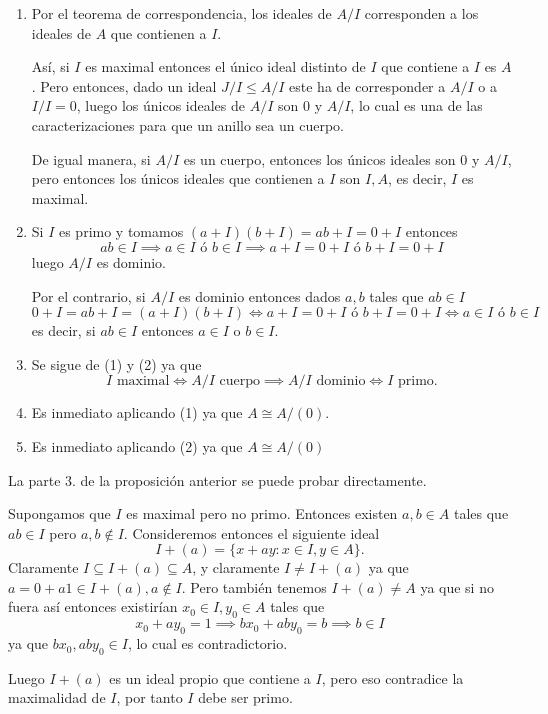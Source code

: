 \begin{proofbox}

\begin{enumerate}
\item Por el teorema de correspondencia, los ideales de $A/I$ corresponden a los ideales de $A$ que contienen a $I$.

Así, si $I$ es maximal entonces el único ideal distinto de $I$ que contiene a $I$ es $A$. Pero entonces, dado un ideal $J/I \leq A/I$ este ha de corresponder a $A/I$ o a $I/I = 0$, luego los únicos ideales de $A/I$ son $0$ y $A/I$, lo cual es una de las caracterizaciones para que un anillo sea un cuerpo. 

De igual manera, si $A/I$ es un cuerpo, entonces los únicos ideales son $0$ y $A/I$, pero entonces los únicos ideales que contienen a $I$ son $I,A$, es decir, $I$ es maximal.

\item Si $I$ es primo y tomamos $(a + I)(b + I) = ab + I = 0 + I$ entonces
\[
ab \in I \implies a \in I \text{ ó } b \in I \implies a + I = 0 + I \text{ ó } b + I = 0 + I
\]
luego $A/I$ es dominio.

Por el contrario, si $A/I$ es dominio entonces dados $a,b$ tales que $ab \in I$
\[
0 + I = ab + I = (a + I)(b + I) \iff a + I = 0 + I \text{ ó } b + I = 0 + I \iff a \in I \text{ ó } b \in I 
\]
es decir, si $ab \in I$ entonces $a \in I$ o $b \in I$.

\item Se sigue de (1) y (2) ya que
\[
I \text{ maximal} \iff A/I \text{ cuerpo} \implies A/I \text{ dominio} \iff I \text{ primo}.
\]

\item Es inmediato aplicando (1) ya que $A \cong A/(0)$.

\item Es inmediato aplicando (2) ya que $A \cong A/(0)$
\end{enumerate}

\end{proofbox}

\begin{remark}
    La parte 3. de la proposición anterior se puede probar directamente. 
    \begin{proofbox}
    Supongamos que $I$ es maximal pero no primo. Entonces existen $a,b \in A$ tales que $ab \in I$ pero $a,b \notin I$. Consideremos entonces el siguiente ideal
    \[
    I + (a) = \{x + ay : x \in I, y \in A\}.
    \]
    Claramente $I \subseteq I + (a) \subseteq A$, y claramente $I \neq I + (a)$ ya que $a = 0 + a1 \in I + (a), a \notin I$. Pero también tenemos $I + (a) \neq A$ ya que si no fuera así entonces existirían $x_0 \in I, y_0 \in A$ tales que
    \[
    x_0 + ay_0 = 1 \implies bx_0 + aby_0 = b \implies b \in I
    \]
    ya que $bx_0, aby_0 \in I$, lo cual es contradictorio.
    
    Luego $I + (a)$ es un ideal propio que contiene a $I$, pero eso contradice la maximalidad de $I$, por tanto $I$ debe ser primo.
    \end{proofbox}
\end{remark}


